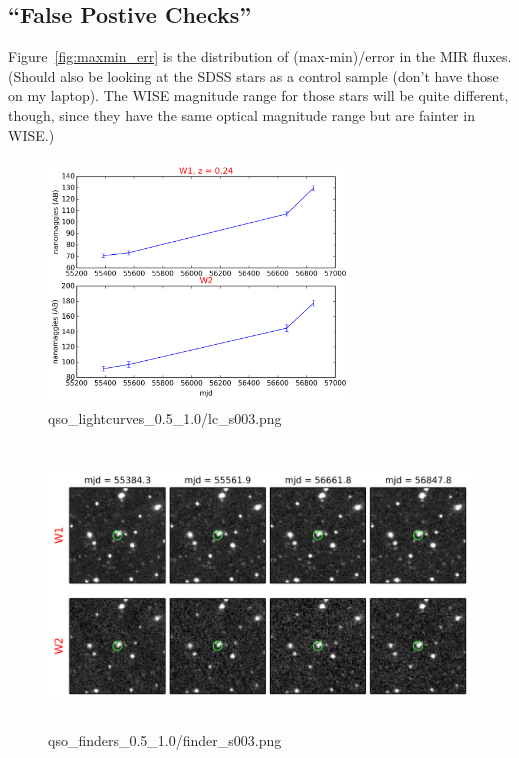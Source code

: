\documentclass{emulateapj}
\begin{document}
\subsection{``False Postive Checks''}
Figure~\ref{fig:maxmin_err} is the distribution of (max-min)/error in
the MIR fluxes.  (Should also be looking at the SDSS stars as a
control sample (don’t have those on my laptop).  The WISE magnitude
range for those stars will be quite different, though, since they have
the same optical magnitude range but are fainter in WISE.)


\begin{figure}
    \includegraphics[width=8.00cm, height=6.50cm, 
    trim=0.0cm 0.0cm 0.0cm 0.0cm, clip]
    {lc_s003.png}
    \centering
    \caption[]{qso\_lightcurves\_0.5\_1.0/lc\_s003.png}
    \label{fig:lc_s003}
\end{figure}
  
\begin{figure}
    \includegraphics[width=14.00cm, height=7.50cm, 
    trim=0.0cm 0.0cm 0.0cm 0.0cm, clip] 
    {finder_s003.png}
    \centering
    \caption[]{qso\_finders\_0.5\_1.0/finder\_s003.png}
    \label{fig:finder_s003}
\end{figure}
\end{document}
